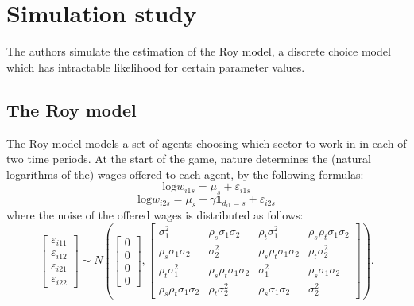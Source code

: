\section{Simulation study}
\label{sec:simulation}

The authors simulate the estimation of the Roy model, a discrete choice model which has intractable likelihood for certain parameter values.

\subsection{The Roy model}
\label{sec:roy}

The Roy model models a set of agents choosing which sector to work in in each of two time periods.
At the start of the game, nature determines the (natural logarithms of the) wages offered to each agent, by the following formulas:
\begin{equation} %
    \text{log} w_{i1s} = \mu_s + \varepsilon_{i1s}
\end{equation}
\begin{equation}
    \text{log} w_{i2s} = \mu_s + \gamma \mathbb{1}_{d_{i1} = s} + \varepsilon_{i2s}
\end{equation}
where the noise of the offered wages is distributed as follows:
\begin{equation}
    \left[\begin{array}{l}\varepsilon_{i 11} \\ \varepsilon_{i 12} \\ \varepsilon_{i 21} \\ \varepsilon_{i 22}\end{array}\right] \sim N\left(\left[\begin{array}{l}0 \\ 0 \\ 0 \\ 0\end{array}\right],\left[\begin{array}{cccc}\sigma_1^2 & \rho_s \sigma_1 \sigma_2 & \rho_t \sigma_1^2 & \rho_s \rho_t \sigma_1 \sigma_2 \\ \rho_s \sigma_1 \sigma_2 & \sigma_2^2 & \rho_s \rho_t \sigma_1 \sigma_2 & \rho_t \sigma_2^2 \\ \rho_t \sigma_1^2 & \rho_s \rho_t \sigma_1 \sigma_2 & \sigma_1^2 & \rho_s \sigma_1 \sigma_2 \\ \rho_s \rho_t \sigma_1 \sigma_2 & \rho_t \sigma_2^2 & \rho_s \sigma_1 \sigma_2 & \sigma_2^2\end{array}\right]\right).
\end{equation}

